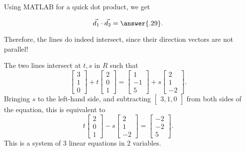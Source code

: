\documentclass{ximera}
\begin{document}
\begin{solution}
  Using MATLAB for a quick dot product, we get 

  $$\vec{d_1}\cdot\vec{d_2}=\answer{.29}.$$

  Therefore, the lines do indeed intersect, since their direction vectors are not parallel!
  
  The two lines intersect at $t,s$ in $R$ such
  that
  \begin{equation*}
    \begin{bmatrix} 3 \\ 1 \\ 0 \end{bmatrix}
    + t \begin{bmatrix} 2 \\ 0 \\ 1 \end{bmatrix}
    = \begin{bmatrix} 1 \\ -1 \\ 5 \end{bmatrix}
    + s \begin{bmatrix} 2 \\ 1 \\ -2 \end{bmatrix}.
  \end{equation*}
  Bringing $s$ to the left-hand side, and subtracting $\begin{bmatrix}3,1,0\end{bmatrix}$
  from both sides of the equation, this is equivalent to
  \begin{equation*}
    t \begin{bmatrix} 2 \\ 0 \\ 1 \end{bmatrix}
    - s \begin{bmatrix} 2 \\ 1 \\ -2 \end{bmatrix}
    = \begin{bmatrix} -2 \\ -2 \\ 5 \end{bmatrix}.
  \end{equation*}
  This is a system of 3 linear equations in 2 variables. 
  

\end{solution}
\end{document}
